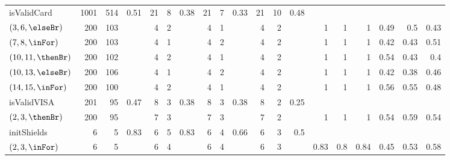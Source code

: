 \begin{table}
\begin{tabular}{l|rrr|rrr|rrr|rrr|rrrrrr}
    \midrule
    \midrule
    isValidCard        & 1001 & 514 & 0.51               & 21 & 8 & 0.38                    & 21 & 7     & 0.33                & 21 & 10    & 0.48 &   &   &   &      &      & \\
    $(3,6,\elseBr)$    & 200  & 103 &                    & 4  & 2 &                         & 4  & 1     &                     & 4  & 2     & & 1 & 1 & 1 & 0.49 & 0.5  & 0.43 \\
    $(7,8,\inFor)$     & 200  & 103 &                    & 4  & 1 &                         & 4  & 2     &                     & 4  & 2     & & 1 & 1 & 1 & 0.42 & 0.43 & 0.51 \\
    $(10,11,\thenBr)$  & 200  & 102 &                    & 4  & 2 &                         & 4  & 1     &                     & 4  & 2     & & 1 & 1 & 1 & 0.54 & 0.43 & 0.4 \\
    $(10,13,\elseBr)$  & 200  & 106 &                    & 4  & 1 &                         & 4  & 2     &                     & 4  & 2     & & 1 & 1 & 1 & 0.42 & 0.38 & 0.46 \\
    $(14,15,\inFor)$   & 200  & 100 &                    & 4  & 2 &                         & 4  & 1     &                     & 4  & 2     & & 1 & 1 & 1 & 0.56 & 0.55 & 0.48 \\
    \midrule
    isValidVISA        & 201  & 95  & 0.47               & 8  & 3 & 0.38                    & 8 & 3      & 0.38                & 8  & 2     & 0.25  &   &   &   &      &      & \\
    $(2,3,\thenBr)$    & 200  & 95  &                    & 7  & 3 &                         & 7 & 3      &                     & 7  & 2     & & 1 & 1 & 1 & 0.54 & 0.59 & 0.54 \\
    \midrule
    \midrule
    initShields        & 6    & 5 & 0.83                 & 6  & 5 & 0.83                    & 6 & 4      & 0.66                & 6 & 3      & 0.5 &      &     &      &      &      & \\
    $(2,3,\inFor)$     & 6    & 5 &                      & 6  & 4 &                         & 6 & 4      &                     & 6 & 3      & & 0.83 & 0.8 & 0.84 & 0.45 & 0.53 & 0.58 \\

\end{tabular}
\end{table}
